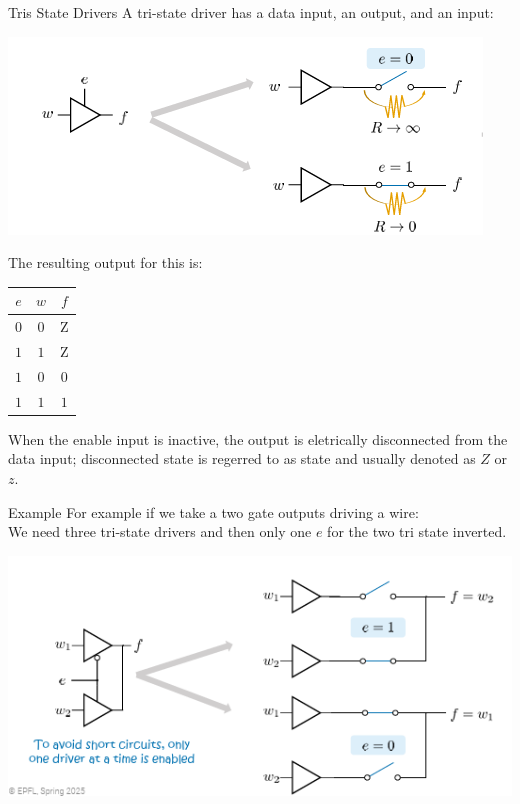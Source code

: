 \begin{parag}{Tris State Drivers}
    A tri-state driver has a data input, an output, and an  input:
    \begin{center}
        \includegraphics[scale=0.7]{12025-03-24.png}
    \end{center}
    The resulting output for this is:
    \begin{center}
    \begin{tabular}{cc|c}
        $e$ & $w$ & $f$ \\
        \hline
        \hline
        $0$ & $0$ & Z\\
        $1$ & $1$ & Z\\
        $1$ & $0$ & $0$\\
        $1$ & $1$ & $1$
    \end{tabular}
    \end{center}
    When the enable input is inactive, the output is eletrically disconnected from the data input; disconnected state is regerred to as  state and usually denoted as $Z$ or $z$.
    
\begin{subparag}{Example}
    For example if we take a two gate outputs driving a wire:\\
    We need three tri-state drivers and then only one $e$ for the two tri state  inverted.
    \begin{center}
        \includegraphics[scale=0.6]{22025-03-24.png}
    \end{center}
\end{subparag}
\end{parag}

